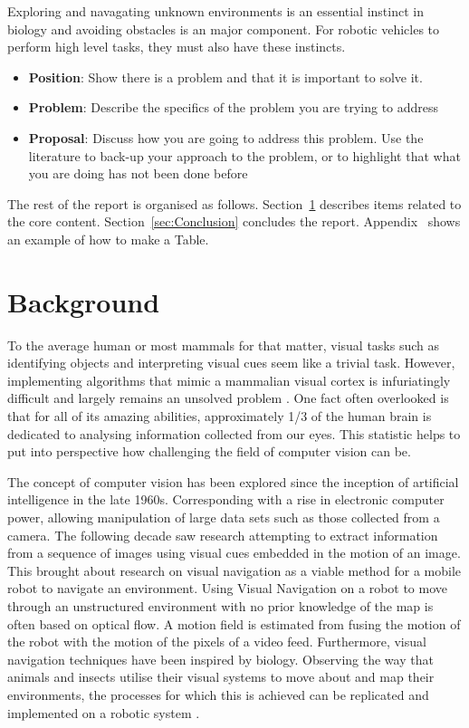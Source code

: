 \documentclass{UoNMCHA}
\numberwithin{equation}{section}
\begin{document}
Exploring and navagating unknown environments is an essential instinct in biology and avoiding obstacles is an major component. For robotic vehicles to perform high level tasks, they must also have these instincts.

\begin{itemize}
    \item \textbf{Position}: Show there is a problem and that it is important to solve it.
    \item \textbf{Problem}: Describe the specifics of the problem you are trying to address
    \item \textbf{Proposal}: Discuss how you are going to address this problem. Use the literature to back-up your approach to the problem, or to highlight that what you are doing has not been done before
\end{itemize}

The rest of the report is organised as follows. Section~\ref{sec:Background} describes items related to the core content. Section~\ref{sec:Conclusion} concludes the report. Appendix~ shows an example of how to make a Table.

\section{Background}\label{sec:Background} %
To the average human or most mammals for that matter, visual tasks such as identifying objects and interpreting visual cues seem like a trivial task. However, implementing algorithms that mimic a mammalian visual cortex is infuriatingly difficult and largely remains an unsolved problem \citep{hartley2003multiple}. One fact often overlooked is that for all of its amazing abilities, approximately 1/3 of the human brain is dedicated to analysing information collected from our eyes. This statistic helps to put into perspective how challenging the field of computer vision can be.

The concept of computer vision has been explored since the inception of artificial intelligence in the late 1960s. Corresponding with a rise in electronic computer power, allowing manipulation of large data sets such as those collected from a camera. The following decade saw research attempting to extract information from a sequence of images using visual cues embedded in the motion of an image. This brought about research on visual navigation as a viable method for a mobile robot to navigate an environment. Using Visual Navigation on a robot to move through an unstructured environment with no prior knowledge of the map is often based on optical flow. A motion field is estimated from fusing the motion of the robot with the motion of the pixels of a video feed. Furthermore, visual navigation techniques have been inspired by biology. Observing the way that animals and insects utilise their visual systems to move about and map their environments, the processes for which this is achieved can be replicated and implemented on a robotic system \citep{altshuler2018comparison}.
\end{document}
